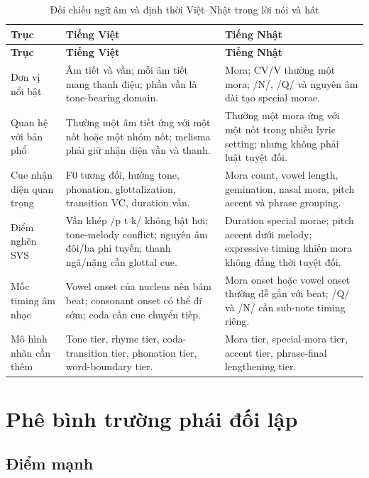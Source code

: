 \documentclass[12pt,a4paper]{article}
\begin{document}
\begin{longtable}{L{0.22\textwidth} L{0.35\textwidth} L{0.35\textwidth}}
\caption{Đối chiếu ngữ âm và định thời Việt--Nhật trong lời nói và hát}\label{tab:comparison}\\
\toprule
\textbf{Trục} & \textbf{Tiếng Việt} & \textbf{Tiếng Nhật}\\
\midrule
\endfirsthead
\toprule
\textbf{Trục} & \textbf{Tiếng Việt} & \textbf{Tiếng Nhật}\\
\midrule
\endhead
Đơn vị nổi bật & Âm tiết và vần; mỗi âm tiết mang thanh điệu; phần vần là tone-bearing domain. & Mora; CV/V thường một mora; /N/, /Q/ và nguyên âm dài tạo special morae.\\
\addlinespace
Quan hệ với bản phổ & Thường một âm tiết ứng với một nốt hoặc một nhóm nốt; melisma phải giữ nhận diện vần và thanh. & Thường một mora ứng với một nốt trong nhiều lyric setting; nhưng không phải luật tuyệt đối.\\
\addlinespace
Cue nhận diện quan trọng & F0 tương đối, hướng tone, phonation, glottalization, transition VC, duration vần. & Mora count, vowel length, gemination, nasal mora, pitch accent và phrase grouping.\\
\addlinespace
Điểm nghẽn SVS & Vần khép /p t k/ không bật hơi; tone-melody conflict; nguyên âm đôi/ba phi tuyến; thanh ngã/nặng cần glottal cue. & Duration special morae; pitch accent dưới melody; expressive timing khiến mora không đẳng thời tuyệt đối.\\
\addlinespace
Mốc timing âm nhạc & Vowel onset của nucleus nên bám beat; consonant onset có thể đi sớm; coda cần cue chuyển tiếp. & Mora onset hoặc vowel onset thường dễ gắn với beat; /Q/ và /N/ cần sub-note timing riêng.\\
\addlinespace
Mô hình nhãn cần thêm & Tone tier, rhyme tier, coda-transition tier, phonation tier, word-boundary tier. & Mora tier, special-mora tier, accent tier, phrase-final lengthening tier.\\
\bottomrule
\end{longtable}

\section{Phê bình trường phái đối lập}

\subsection{Điểm mạnh}
\end{document}
